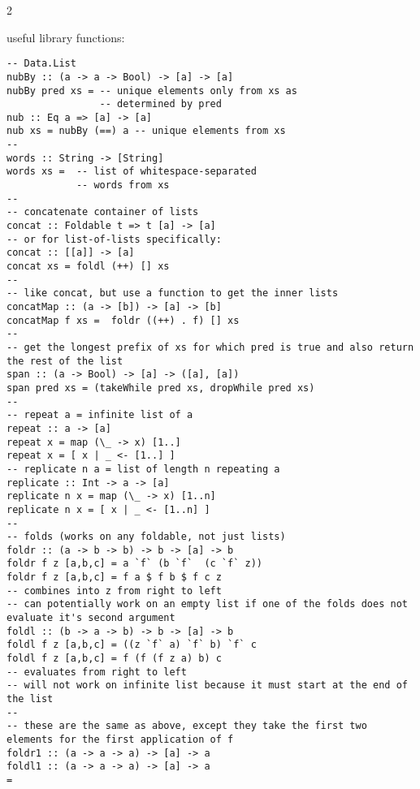 \documentclass{article}
\def \columncount {2}
\begin{document}
\begin{multicols}{\columncount}
\begin{outline}[longenum]
\0 useful library functions:
\begin{verbatim}
-- Data.List
nubBy :: (a -> a -> Bool) -> [a] -> [a]
nubBy pred xs = -- unique elements only from xs as 
                -- determined by pred
nub :: Eq a => [a] -> [a]
nub xs = nubBy (==) a -- unique elements from xs
-- 
words :: String -> [String]
words xs =  -- list of whitespace-separated 
            -- words from xs
--
-- concatenate container of lists
concat :: Foldable t => t [a] -> [a]
-- or for list-of-lists specifically:
concat :: [[a]] -> [a]
concat xs = foldl (++) [] xs
--
-- like concat, but use a function to get the inner lists
concatMap :: (a -> [b]) -> [a] -> [b]
concatMap f xs =  foldr ((++) . f) [] xs
-- 
-- get the longest prefix of xs for which pred is true and also return the rest of the list
span :: (a -> Bool) -> [a] -> ([a], [a])
span pred xs = (takeWhile pred xs, dropWhile pred xs)
-- 
-- repeat a = infinite list of a
repeat :: a -> [a]
repeat x = map (\_ -> x) [1..]
repeat x = [ x | _ <- [1..] ]
-- replicate n a = list of length n repeating a
replicate :: Int -> a -> [a]
replicate n x = map (\_ -> x) [1..n]
replicate n x = [ x | _ <- [1..n] ]
--
-- folds (works on any foldable, not just lists)
foldr :: (a -> b -> b) -> b -> [a] -> b
foldr f z [a,b,c] = a `f` (b `f`  (c `f` z))
foldr f z [a,b,c] = f a $ f b $ f c z
-- combines into z from right to left
-- can potentially work on an empty list if one of the folds does not evaluate it's second argument
foldl :: (b -> a -> b) -> b -> [a] -> b
foldl f z [a,b,c] = ((z `f` a) `f` b) `f` c
foldl f z [a,b,c] = f (f (f z a) b) c
-- evaluates from right to left
-- will not work on infinite list because it must start at the end of the list
-- 
-- these are the same as above, except they take the first two elements for the first application of f
foldr1 :: (a -> a -> a) -> [a] -> a
foldl1 :: (a -> a -> a) -> [a] -> a
= \end{verbatim}



\end{outline}
\end{multicols}
\end{document}
